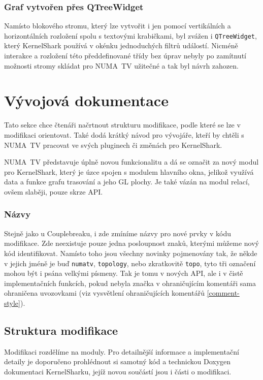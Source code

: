 \subsubsection*{Graf vytvořen přes QTreeWidget}
Namísto blokového stromu, který lze vytvořit i jen pomocí vertikálních a horizontálních rozložení spolu s textovými krabičkami, byl zvážen i \texttt{QTreeWidget}, který KernelShark používá v okénku jednoduchých filtrů událostí. Nicméně interakce a rozložení této předdefinované třídy bez úprav nebyly po zamítnutí možnosti stromy skládat pro NUMA~TV užitečné a tak byl návrh zahozen.

\section{Vývojová dokumentace}
Tato sekce chce čtenáři načrtnout strukturu modifikace, podle které se lze v modifikaci orientovat. Také dodá krátký návod pro vývojáře, kteří by chtěli s NUMA~TV pracovat ve svých pluginech či změnách pro KernelShark.

NUMA~TV představuje úplně novou funkcionalitu a dá se označit za nový modul pro KernelShark, který je úzce spojen s modulem hlavního okna, jelikož využívá data a funkce grafu trasování a jeho GL plochy. Je také vázán na modul relací, ovšem slaběji, pouze skrze API. 

\subsubsection*{Názvy}
Stejně jako u Couplebreaku, i zde zmíníme názvy pro nové prvky v kódu modifikace. Zde neexistuje pouze jedna posloupnost znaků, kterými můžeme nový kód identifikovat. Namísto toho jsou všechny novinky pojmenovány tak, že někde v jejich jméně je buď \texttt{numatv}, \texttt{topology}, nebo zkratkovitě \texttt{topo}, tyto tři označení mohou být i psána velkými písmeny. Tak je tomu v nových API, ale i v čistě implementačních funkcích, pokud nebyla značka v ohraničujícím komentáři sama ohraničena uvozovkami (viz vysvětlení ohraničujících komentářů \ref{comment-style}).

\subsection{Struktura modifikace}
Modifikaci rozdělíme na moduly. Pro detailnější informace a implementační detaily je doporučeno prohlédnout si samotný kód a technickou Doxygen dokumentaci KernelSharku, jejíž novou součástí jsou i části o modifikaci.

